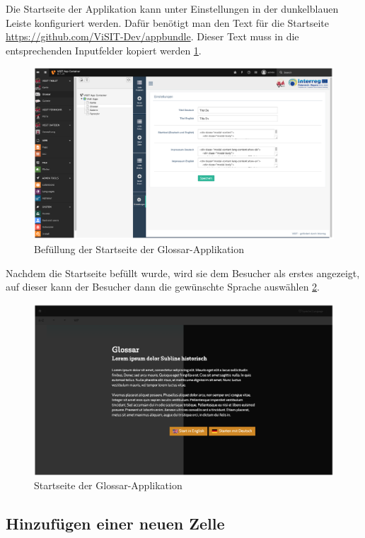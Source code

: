 Die Startseite der Applikation kann unter Einstellungen in der dunkelblauen Leiste konfiguriert werden. Dafür benötigt man den Text für die Startseite \url{https://github.com/ViSIT-Dev/appbundle}. Dieser Text muss in die entsprechenden Inputfelder kopiert werden \ref{img:startseite_glossar}.

\begin{figure}[ht!]
\centering
\includegraphics[width=12cm]{Figures/paula/glossar/startseite_glossar.png}
\caption{Befüllung der Startseite der Glossar-Applikation}
\label{img:startseite_glossar}
\end{figure}

Nachdem die Startseite befüllt wurde, wird sie dem Besucher als erstes angezeigt, auf dieser kann der Besucher dann die gewünschte Sprache auswählen \ref{img:startseite_glossar_tablet}.

\begin{figure}[ht!]
\centering
\includegraphics[width=12cm]{Figures/paula/glossar/startseite_glossar_tablet.png}
\caption{Startseite der Glossar-Applikation}
\label{img:startseite_glossar_tablet}
\end{figure}

\subsection{Hinzufügen einer neuen Zelle}

